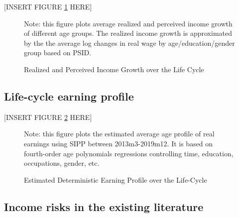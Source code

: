 \begin{center}
[INSERT FIGURE \ref{fig:growth_age_compare} HERE] 
\end{center}


 \begin{figure}[!ht]
    	\caption{Realized and Perceived Income Growth over the Life Cycle}
    	\label{fig:growth_age_compare}
    	\begin{center}
    	\end{center}
    	\begin{flushleft} Note: this figure plots average realized and perceived income growth of different age groups. The realized income growth is approximated by the the average log changes in real wage by age/education/gender group based on PSID.\end{flushleft}
    \end{figure}
    

\subsection{Life-cycle earning profile}
\label{appendix:life-cycle-determinstic}

\begin{center}
[INSERT FIGURE \ref{fig:life-cycle-determinstic} HERE]  
\end{center}

 \begin{figure}[!ht]
    	\caption{Estimated Deterministic Earning Profile over the Life-Cycle}
    	\label{fig:life-cycle-determinstic}
    	\begin{center}
    	\end{center}
    	\begin{flushleft}Note:  this figure plots the estimated average age profile of real earnings using SIPP between 2013m3-2019m12. It is based on fourth-order age polynomials regressions controlling time, education, occupations, gender, etc.\end{flushleft}
    \end{figure}
    
    
\subsection{Income risks in the existing literature}


